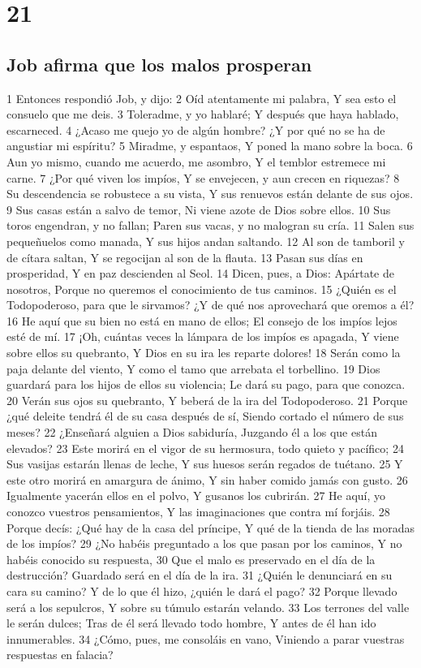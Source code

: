 \chapter{21}

\section*{Job afirma que los malos prosperan}

1 Entonces respondió Job, y dijo:
2 Oíd atentamente mi palabra,
Y sea esto el consuelo que me deis.
3 Toleradme, y yo hablaré;
Y después que haya hablado, escarneced.
4 ¿Acaso me quejo yo de algún hombre?
¿Y por qué no se ha de angustiar mi espíritu?
5 Miradme, y espantaos,
Y poned la mano sobre la boca.
6 Aun yo mismo, cuando me acuerdo, me asombro,
Y el temblor estremece mi carne.
7 ¿Por qué viven los impíos,
Y se envejecen, y aun crecen en riquezas?
8 Su descendencia se robustece a su vista,
Y sus renuevos están delante de sus ojos.
9 Sus casas están a salvo de temor,
Ni viene azote de Dios sobre ellos.
10 Sus toros engendran, y no fallan;
Paren sus vacas, y no malogran su cría.
11 Salen sus pequeñuelos como manada,
Y sus hijos andan saltando.
12 Al son de tamboril y de cítara saltan,
Y se regocijan al son de la flauta.
13 Pasan sus días en prosperidad,
Y en paz descienden al Seol.
14 Dicen, pues, a Dios: Apártate de nosotros,
Porque no queremos el conocimiento de tus caminos.
15 ¿Quién es el Todopoderoso, para que le sirvamos?
¿Y de qué nos aprovechará que oremos a él?
16 He aquí que su bien no está en mano de ellos;
El consejo de los impíos lejos esté de mí.
17 ¡Oh, cuántas veces la lámpara de los impíos es apagada,
Y viene sobre ellos su quebranto,
Y Dios en su ira les reparte dolores!
18 Serán como la paja delante del viento,
Y como el tamo que arrebata el torbellino.
19 Dios guardará para los hijos de ellos su violencia;
Le dará su pago, para que conozca.
20 Verán sus ojos su quebranto,
Y beberá de la ira del Todopoderoso.
21 Porque ¿qué deleite tendrá él de su casa después de sí,
Siendo cortado el número de sus meses?
22 ¿Enseñará alguien a Dios sabiduría,
Juzgando él a los que están elevados?
23 Este morirá en el vigor de su hermosura, todo quieto y pacífico;
24 Sus vasijas estarán llenas de leche,
Y sus huesos serán regados de tuétano.
25 Y este otro morirá en amargura de ánimo,
Y sin haber comido jamás con gusto.
26 Igualmente yacerán ellos en el polvo,
Y gusanos los cubrirán.
27 He aquí, yo conozco vuestros pensamientos,
Y las imaginaciones que contra mí forjáis.
28 Porque decís: ¿Qué hay de la casa del príncipe,
Y qué de la tienda de las moradas de los impíos?
29 ¿No habéis preguntado a los que pasan por los caminos,
Y no habéis conocido su respuesta,
30 Que el malo es preservado en el día de la destrucción?
Guardado será en el día de la ira.
31 ¿Quién le denunciará en su cara su camino?
Y de lo que él hizo, ¿quién le dará el pago?
32 Porque llevado será a los sepulcros,
Y sobre su túmulo estarán velando.
33 Los terrones del valle le serán dulces;
Tras de él será llevado todo hombre,
Y antes de él han ido innumerables.
34 ¿Cómo, pues, me consoláis en vano,
Viniendo a parar vuestras respuestas en falacia? 


